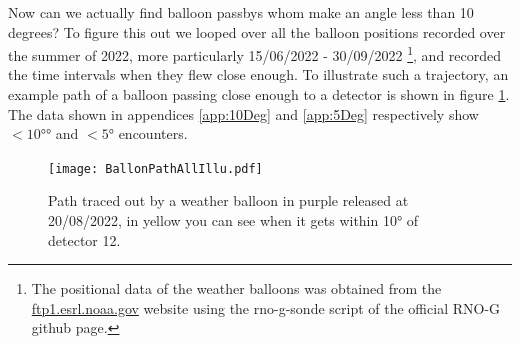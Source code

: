 Now can we actually find balloon passbys whom make an angle less than 10 degrees?
To figure this out we looped over all the balloon positions recorded over the summer of
2022, more particularly 15/06/2022 - 30/09/2022
\footnote{The positional data of the weather balloons was obtained from the
\url{ftp1.esrl.noaa.gov} website using the rno-g-sonde script of the official
RNO-G github page.}, and recorded
the time intervals when they flew close enough.
To illustrate such a trajectory, an example path of a balloon passing close enough to a detector is shown in figure
\ref{fig:ExampleBalloonPathCrossing12}.
The data shown in appendices \ref{app:10Deg} and \ref{app:5Deg} respectively show $<10°$° and $<5$° encounters.
\begin{figure}
  \centering
	\texttt{[image: BallonPathAllIllu.pdf]}
  \caption{Path traced out by a weather balloon in purple released at 20/08/2022, in yellow you can see when it
  gets within 10° of detector 12.}
  \label{fig:ExampleBalloonPathCrossing12}
\end{figure}

